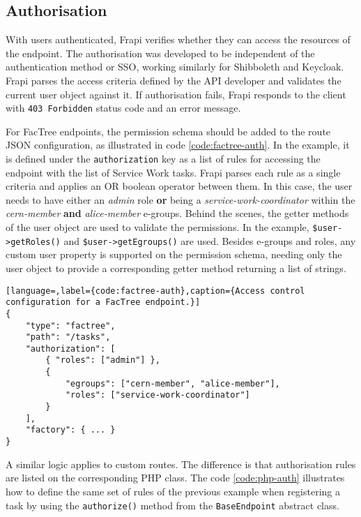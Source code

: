 \subsection{Authorisation}
\label{sec:frapi-v1-authorisation}

With users authenticated, Frapi verifies whether they can access the resources of the endpoint. The authorisation was developed to be independent of the authentication method or SSO, working similarly for Shibboleth and Keycloak. Frapi parses the access criteria defined by the API developer and validates the current user object against it. If authorisation fails, Frapi responds to the client with \texttt{403 Forbidden} status code and an error message.

For FacTree endpoints, the permission schema should be added to the route JSON configuration, as illustrated in code \autoref{code:factree-auth}. In the example, it is defined under the \texttt{authorization} key as a list of rules for accessing the endpoint with the list of Service Work tasks. Frapi parses each rule as a single criteria and applies an OR boolean operator between them. In this case, the user needs to have either an \textit{admin} role \textbf{or} being a \textit{service-work-coordinator} within the \textit{cern-member} \textbf{and} \textit{alice-member} e-groups. Behind the scenes, the getter methods of the user object are used to validate the permissions. In the example, \texttt{\$user->getRoles()} and \texttt{\$user->getEgroups()} are used. Besides e-groups and roles, any custom user property is supported on the permission schema, needing only the user object to provide a corresponding getter method returning a list of strings.

\begin{lstlisting}[language=,label={code:factree-auth},caption={Access control configuration for a FacTree endpoint.}]
{
    "type": "factree",
    "path": "/tasks",
    "authorization": [
        { "roles": ["admin"] },
        {
	        "egroups": ["cern-member", "alice-member"],
	        "roles": ["service-work-coordinator"]
	    }
    ],
    "factory": { ... }
}
\end{lstlisting}

A similar logic applies to custom routes. The difference is that authorisation rules are listed on the corresponding PHP class. The code \autoref{code:php-auth} illustrates how to define the same set of rules of the previous example when registering a task by using the \texttt{authorize()} method from the \texttt{BaseEndpoint} abstract class.

